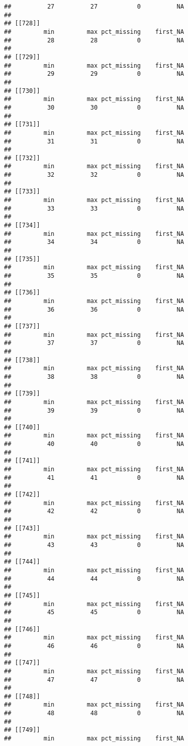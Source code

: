 \documentclass[
]{article}
\begin{document}
\begin{verbatim}
##          27          27           0          NA 
## 
## [[728]]
##         min         max pct_missing    first_NA 
##          28          28           0          NA 
## 
## [[729]]
##         min         max pct_missing    first_NA 
##          29          29           0          NA 
## 
## [[730]]
##         min         max pct_missing    first_NA 
##          30          30           0          NA 
## 
## [[731]]
##         min         max pct_missing    first_NA 
##          31          31           0          NA 
## 
## [[732]]
##         min         max pct_missing    first_NA 
##          32          32           0          NA 
## 
## [[733]]
##         min         max pct_missing    first_NA 
##          33          33           0          NA 
## 
## [[734]]
##         min         max pct_missing    first_NA 
##          34          34           0          NA 
## 
## [[735]]
##         min         max pct_missing    first_NA 
##          35          35           0          NA 
## 
## [[736]]
##         min         max pct_missing    first_NA 
##          36          36           0          NA 
## 
## [[737]]
##         min         max pct_missing    first_NA 
##          37          37           0          NA 
## 
## [[738]]
##         min         max pct_missing    first_NA 
##          38          38           0          NA 
## 
## [[739]]
##         min         max pct_missing    first_NA 
##          39          39           0          NA 
## 
## [[740]]
##         min         max pct_missing    first_NA 
##          40          40           0          NA 
## 
## [[741]]
##         min         max pct_missing    first_NA 
##          41          41           0          NA 
## 
## [[742]]
##         min         max pct_missing    first_NA 
##          42          42           0          NA 
## 
## [[743]]
##         min         max pct_missing    first_NA 
##          43          43           0          NA 
## 
## [[744]]
##         min         max pct_missing    first_NA 
##          44          44           0          NA 
## 
## [[745]]
##         min         max pct_missing    first_NA 
##          45          45           0          NA 
## 
## [[746]]
##         min         max pct_missing    first_NA 
##          46          46           0          NA 
## 
## [[747]]
##         min         max pct_missing    first_NA 
##          47          47           0          NA 
## 
## [[748]]
##         min         max pct_missing    first_NA 
##          48          48           0          NA 
## 
## [[749]]
##         min         max pct_missing    first_NA 

\end{verbatim}
\end{document}
